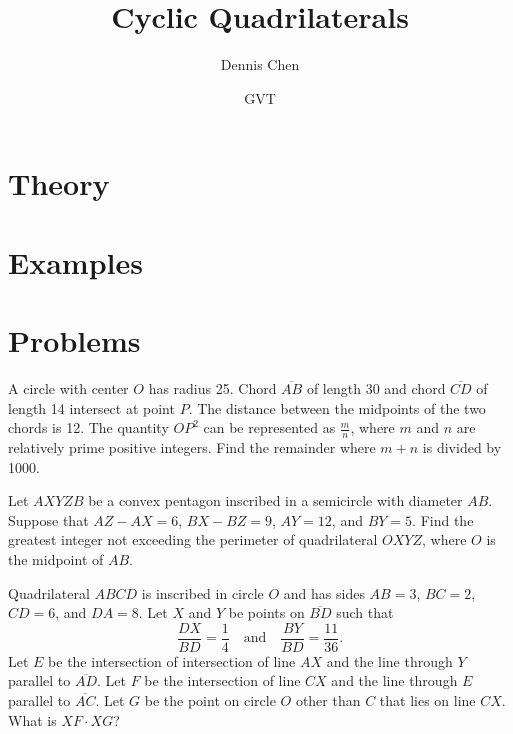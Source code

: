 \documentclass[mast]{lucky}
\title{Cyclic Quadrilaterals}
\author{Dennis Chen}
\date{GVT}
\begin{document}
\maketitle

\section{Theory}

\section{Examples}

\pagebreak

\section{Problems}


\begin{prob}[AIME II 2011/10]{3}
A circle with center $O$ has radius 25. Chord $\overline{AB}$ of length 30 and chord $\overline{CD}$ of length 14 intersect at point $P$. The distance between the midpoints of the two chords is 12. The quantity $OP^2$ can be represented as $\frac{m}{n}$, where $m$ and $n$ are relatively prime positive integers. Find the remainder where $m+n$ is divided by 1000.
\end{prob}

\begin{prob}{4}
Let $AXYZB$ be a convex pentagon inscribed in a semicircle with diameter $AB$. Suppose that $AZ-AX=6$, $BX-BZ=9$, $AY=12$, and $BY=5$. Find the greatest integer not exceeding the perimeter of quadrilateral $OXYZ$, where $O$ is the midpoint of $AB$.
\end{prob}

\begin{prob}[AMC 12A 2017/24]{6}
Quadrilateral $ABCD$ is inscribed in circle $O$ and has sides $AB = 3$, $BC = 2$, $CD = 6$, and $DA = 8$. Let $X$ and $Y$ be points on $\overline{BD}$ such that
\[\frac{DX}{BD} = \frac{1}{4} \quad \text{and} \quad \frac{BY}{BD} = \frac{11}{36}.\]Let $E$ be the intersection of intersection of line $AX$ and the line through $Y$ parallel to $\overline{AD}$. Let $F$ be the intersection of line $CX$ and the line through $E$ parallel to $\overline{AC}$. Let $G$ be the point on circle $O$ other than $C$ that lies on line $CX$. What is $XF \cdot XG$?
\end{prob}
\end{document}
